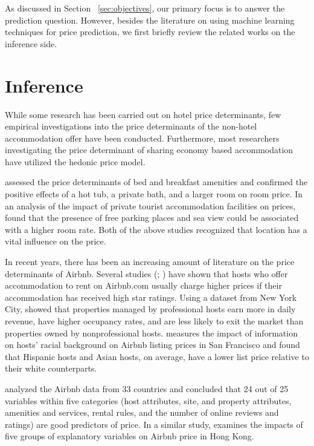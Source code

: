 
As discussed in Section ~\ref{sec:objectives}, our primary focus is to answer
the prediction question. However, besides the literature on using machine
learning techniques for price prediction, we first briefly review the related
works on the inference side.

\section{Inference}

While some research has been carried out on hotel price determinants, few
empirical investigations into the price determinants of the non-hotel
accommodation offer have been conducted.  Furthermore, most researchers
investigating the price determinant of sharing economy based accommodation have
utilized the hedonic price model.

\cite{monty2003hedonic} assessed the price determinants of bed and breakfast
amenities and confirmed the positive effects of a hot tub, a private bath, and a
larger room on room price.  In an analysis of the impact of private tourist
accommodation facilities on prices, \cite{portolan2013impact} found that the
presence of free parking places and sea view could be associated with a higher
room rate.  Both of the above studies recognized that location has a vital
influence on the price.

In recent years, there has been an increasing amount of literature on the price
determinants of Airbnb.  Several studies (\cite{gutt2015sharing};
\cite{ikkala2014defining} ) have shown that hosts who offer accommodation to
rent on Airbnb.com usually charge higher prices if their accommodation has
received high star ratings.  Using a dataset from New York City,
\cite{li2016pros,} showed that properties managed by professional hosts earn
more in daily revenue, have higher occupancy rates, and are less likely to exit
the market than properties owned by nonprofessional hosts.
\cite{kakar2016effects} measures the impact of information on hosts’ racial
background on Airbnb listing prices in San Francisco and found that Hispanic
hosts and Asian hosts, on average, have a lower list price relative to their
white counterparts.

\cite{wang2017price} analyzed the Airbnb data from 33 countries and concluded
that 24 out of 25 variables within five categories (host attributes, site, and
property attributes, amenities and services, rental rules, and the number of
online reviews and ratings) are good predictors of price.  In a similar study,
\cite{cai2019price} examines the impacts of five groups of
explanatory variables on Airbnb price in Hong Kong.


